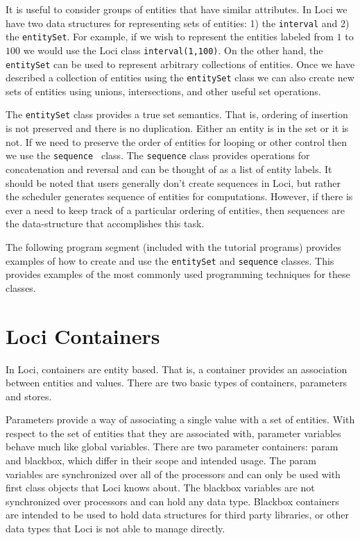 \documentclass[10pt,epsf]{book}
\begin{document}
It is useful to consider groups of entities that have similar
attributes.  In Loci we have two data structures for representing sets
of entities:  1) the {\tt interval} and 2) the {\tt entitySet}.  For
example, if we wish to represent the entities labeled from $1$ to
$100$ we would use the Loci class {\tt interval(1,100)}.  On the other
hand, the {\tt entitySet} can be used to represent arbitrary
collections of entities.  Once we have described a collection of
entities using the {\tt entitySet} class we can also create new sets
of entities using unions, intersections, and other useful set
operations.  

The {\tt entitySet} class provides a true set semantics.
That is, ordering of insertion is not preserved and there is no
duplication.  Either an entity is in the set or it is not.  If we need
to preserve the order of entities for looping or other control then we
use the {\tt sequence } class.  The {\tt sequence} class provides
operations for concatenation and reversal and can be thought
of as a list of entity labels.  It should be noted that users
generally don't create sequences in Loci, but rather the scheduler
generates sequence of entities for computations.  However, if there is
ever a need to keep track of a particular ordering of entities, then
sequences are the data-structure that accomplishes this task.

The following program segment (included with the tutorial programs)
provides examples of how to create and use the {\tt  entitySet} and
{\tt sequence} classes.  This provides examples of the most commonly
used programming techniques for these classes.



\section{Loci Containers}

In Loci, containers are entity based.  That is, a container provides
an association between entities and values.  There are two basic types
of containers, parameters and stores.

Parameters provide a way of associating a single value with a set of
entities.  With respect to the set of entities that they are associated
with, parameter variables behave much like global variables.  There are
two parameter containers: param and blackbox, which differ in their
scope and intended usage.  The param variables are synchronized over all
of the processors and can only be used with first class objects that Loci
knows about.  The blackbox variables are not synchronized over processors
and can hold any data type.  Blackbox containers are intended to be used
to hold data structures for third party libraries, or other data types
that Loci is not able to manage directly.
\end{document}
